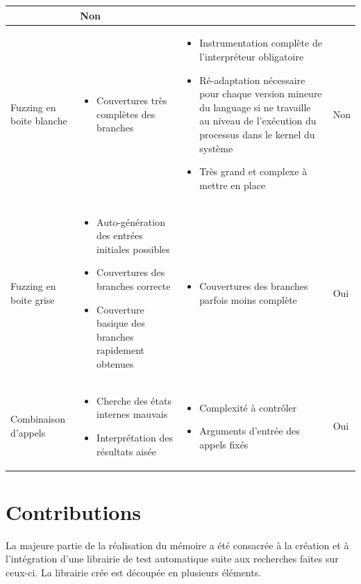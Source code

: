 \documentclass[a4paper]{report}
\begin{document}
\begin{landscape}
\begin{tabularx}{1\linewidth}{>{\centering}p{}||p{}|p{}|p{}}
\begin{itemize}
	\end{itemize}
	 & Non \\ 
	\hline   
	Fuzzing en boite blanche & 
	\begin{itemize}
	\item Couvertures très complètes des branches
	\end{itemize}
	 & 
	\begin{itemize}
	\item Instrumentation complète de l'interpréteur obligatoire
	\item Ré-adaptation nécessaire pour chaque version mineure du language si ne travaille au niveau de l'exécution du processus dans le kernel du système
	\item Très grand et complexe à mettre en place 
	\end{itemize}
	 & Non \\ 
	\hline   
	Fuzzing en boite grise & 
	\begin{itemize}
	\item Auto-génération des entrées initiales possibles
	\item Couvertures des branches correcte
	\item Couverture basique des branches rapidement obtenues
	\end{itemize}
	 & 
	\begin{itemize}
	\item Couvertures des branches parfois moins complète
	\end{itemize}
	 & Oui \\ 
	\hline   
	Combinaison d'appels & 
	\begin{itemize}
	\item Cherche des états internes mauvais
	\item  Interprétation des résultats aisée
	\end{itemize}
	 & 
	\begin{itemize}
	\item Complexité à contrôler
	\item Arguments d'entrée des appels fixés
	\end{itemize}
	 & Oui \\ 
	\hline 
	\end{tabularx}
\end{landscape}
\restoregeometry 



\chapter{Contributions}
La majeure partie de la réalisation du mémoire a été consacrée à la création et à l'intégration d'une librairie de test automatique suite aux recherches faites sur ceux-ci.
La librairie crée est découpée en plusieurs éléments.
\end{document}
